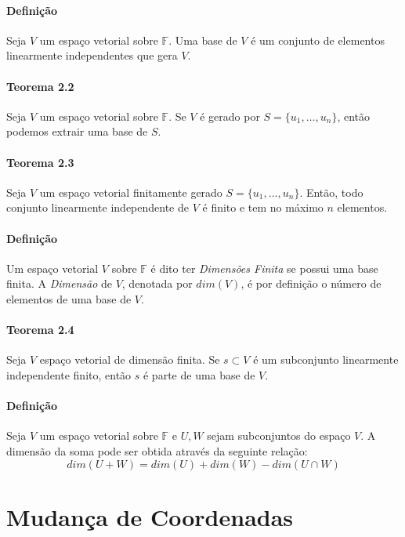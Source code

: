 \documentclass{article}
\begin{document}
            \paragraph{Definição}Seja $V$ um espaço vetorial sobre $\mathbb{F}$. Uma base de $V$ é um conjunto de elementos linearmente independentes que gera $V$.

            \paragraph{Teorema 2.2}Seja $V$ um espaço vetorial sobre $\mathbb{F}$. Se $V$ é gerado por $S=\{u_{1},\dots,u_{n}\}$, então podemos extrair uma base de $S$.

            \paragraph{Teorema 2.3}Seja $V$ um espaço vetorial finitamente gerado $S=\{u_{1},\dots,u_{n}\}$. Então, todo conjunto linearmente independente de $V$ é finito e tem no máximo $n$ elementos.

            \paragraph{Definição}Um espaço vetorial $V$ sobre $\mathbb{F}$ é dito ter \textit{Dimensões Finita} se possui uma base finita. A \textit{Dimensão} de $V$, denotada por $dim(V)$, é por definição o número de elementos de uma base de $V$.

            \paragraph{Teorema 2.4}Seja $V$ espaço vetorial de dimensão finita. Se $s\subset V$ é um subconjunto linearmente independente finito, então $s$ é parte de uma base de $V$.

            \paragraph{Definição}Seja $V$ um espaço vetorial sobre $\mathbb{F}$ e $U, W$ sejam subconjuntos do espaço $V$. A dimensão da soma pode ser obtida através da seguinte relação:
                \[\boxed{dim(U+W) = dim(U) + dim(W) - dim(U\cap W)}\]
\newpage

    \section{Mudança de Coordenadas}
\end{document}
